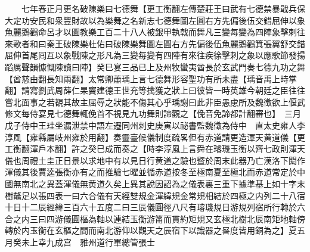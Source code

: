 　　七年春正月更名破陳樂曰七德舞【更工衡翻左傳楚莊王曰武有七德禁暴戢兵保大定功安民和衆豐財故以為樂舞之名新志七德舞圖左圓右方先偏後伍交錯屈伸以象魚麗鵝鸛命呂才以圖教樂工百二十八人被銀甲執戟而舞凡三變每變為四陣象擊刺往來歌者和曰秦王破陳樂杜佑曰破陳樂舞圖左圓右方先偏後伍魚麗鵝鸛箕張翼舒交錯屈伸首尾囘互以象戰陳之形凡為三變每變有四陣有來往疾徐擊刺之象以應歌節發揚蹈厲聲韻慷慨陳讀曰陣】癸巳宴三品已上及州牧蠻夷酋長於玄武門奏七德九功之舞【酋慈由翻長知兩翻】太常卿蕭瑀上言七德舞形容聖功有所未盡【瑀音禹上時掌翻】請寫劉武周薛仁杲竇建德王世充等擒獲之狀上曰彼皆一時英雄今朝廷之臣往往嘗北面事之若覩其故主屈辱之狀能不傷其心乎瑀謝曰此非臣愚慮所及魏徵欲上偃武修文每侍宴見七德舞輒俛首不視見九功舞則諦觀之【俛音免諦都計翻審也】　三月戊子侍中王珪坐漏泄禁中語左遷同州刺史庚寅以祕書監魏徵為侍中　直太史雍人李淳風【雍縣屬岐州雍於用翻】奏靈臺候儀制度疏畧但有赤道請更造渾天黄道儀【更工衡翻渾戶本翻】許之癸巳成而奏之【時李淳風上言舜在璿璣玉衡以齊七政則渾天儀也周禮土圭正日景以求地中有以見日行黄道之驗也暨於周末此器乃亡漢洛下閎作渾儀其後賈逵張衡亦有之而推驗七曜並循赤道按冬至極南夏至極北而赤道常定於中國無南北之異蓋渾儀無黄道久矣上異其說因詔為之儀表裏三重下據準基上如十字末樹鼇足以張四表一曰六合儀有天經雙規金渾緯規金常規相結於四極之内列二十八宿十日十二辰經緯三百六十五度二曰三辰儀圓徑八尺有璿璣規日游規列宿所行轉於六合之内三曰四游儀圓樞為軸以連結玉衡游筩而貫約矩規又玄極北樹北辰南矩地軸傍轉於内玉衡在玄樞之間而南北游仰以觀天之辰宿下以識器之晷度皆用銅為之】夏五月癸未上幸九成宫　雅州道行軍總管張士

